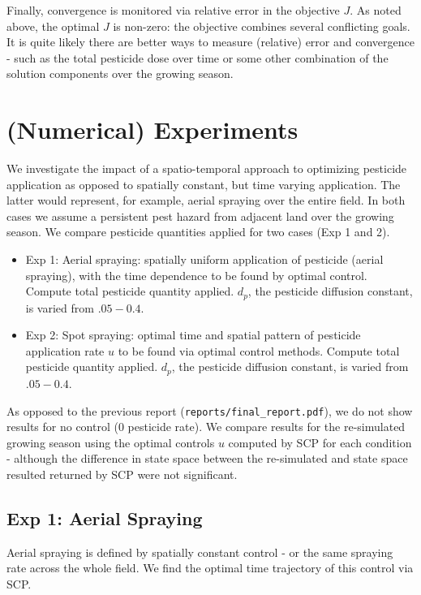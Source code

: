 \documentclass[11pt]{article}
\begin{document}
Finally, convergence is monitored via relative error in the objective $J$. As noted above, the optimal $J$ is non-zero: the objective combines several conflicting goals. It is quite likely there are better ways to measure (relative) error and convergence - such as the total pesticide dose over time or some other combination of the solution components over the growing season.

\section{(Numerical) Experiments}

We investigate the impact of a spatio-temporal approach to optimizing pesticide application as opposed to spatially constant, but time varying application. The latter would represent, for example, aerial spraying over the entire field. In both cases we assume a persistent pest hazard from adjacent land over the growing season. We compare pesticide quantities applied for two cases (Exp 1 and 2).

\begin{itemize}
	\setlength\itemsep{-1pt}
	\item Exp 1: Aerial spraying: spatially uniform application of pesticide (aerial spraying), with the time dependence to be found by optimal control. Compute total pesticide quantity applied. $d_p$, the pesticide diffusion constant, is varied from $.05 - 0.4$.
	\item Exp 2: Spot spraying: optimal time and spatial pattern of pesticide application rate $u$ to be found via optimal control methods. Compute total pesticide quantity applied. $d_p$, the pesticide diffusion constant, is varied from $.05 - 0.4$.
\end{itemize}

As opposed to the previous report (\texttt{reports/final\_report.pdf}), we do not show results for no control (0 pesticide rate). We compare results for the re-simulated growing season using the optimal controls $u$ computed by SCP for each condition - although the difference in state space between the re-simulated and state space resulted returned by SCP were not significant.

\subsection{Exp 1: Aerial Spraying}

Aerial spraying is defined by spatially constant control - or the same spraying rate across the whole field. We find the optimal time trajectory of this control via SCP. 
\end{document}
